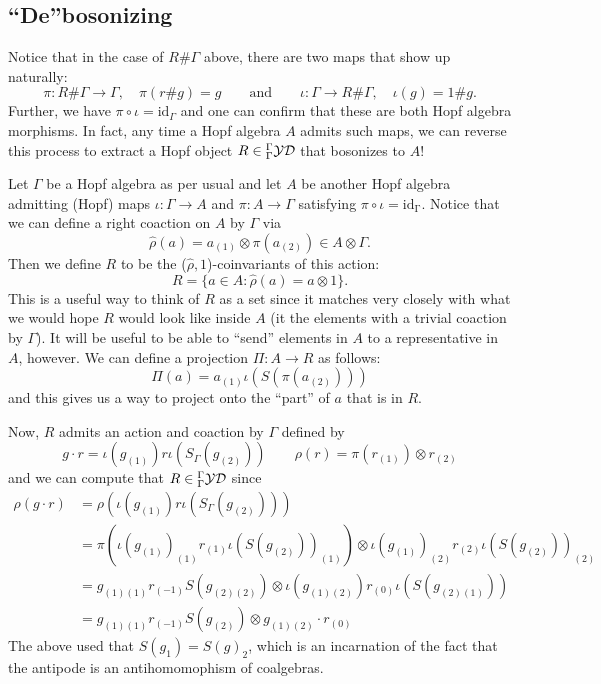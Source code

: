 \documentclass [11pt, proquest] {uwthesis}[2020/02/24]
\begin{document}
\subsection{``De''bosonizing}
    Notice that in the case of $R\#\Gamma$ above, there are two maps that show up naturally:
    \[\pi:R\#\Gamma\to \Gamma,\quad \pi(r\# g)=g\qquad\text{and}\qquad \iota:\Gamma\to R\# \Gamma,\quad \iota(g)=1\# g.\]
    Further, we have $\pi\circ\iota=\mathrm{id}_{\Gamma}$ and one can confirm that these are both Hopf algebra morphisms. In fact, any time a Hopf algebra $A$ admits such maps, we can reverse this process to extract a Hopf object $R\in{^\Gamma_\Gamma\mathcal{YD}}$ that bosonizes to $A$!
    
    Let $\Gamma$ be a Hopf algebra as per usual and let $A$ be another Hopf algebra admitting (Hopf) maps $\iota:\Gamma\to A$ and $\pi:A\to \Gamma$ satisfying $\pi\circ\iota=\mathrm{id_\Gamma}.$ Notice that we can define a right coaction on $A$ by $\Gamma$ via
    \[\hat\rho(a)=a_{(1)}\otimes\pi(a_{(2)})\in A\otimes \Gamma.\]
    Then we define $R$ to be the ($\hat\rho,1$)-coinvariants of this action:
    \[R=\{a\in A:\hat\rho(a)=a\otimes 1\}.\]
    This is a useful way to think of $R$ as a set since it matches very closely with what we would hope $R$ would look like inside $A$ (it the elements with a trivial coaction by $\Gamma$). It will be useful to be able to ``send'' elements in $A$ to a representative in $A$, however. We can define a projection $\Pi:A\to R$ as follows:
    \[\Pi(a)=a_{(1)}\iota(S(\pi(a_{(2)})))\]
    and this gives us a way to project onto the ``part'' of $a$ that is in $R$.
    
    Now, $R$ admits an action and coaction by $\Gamma$ defined by
    \[g\cdot r = \iota(g_{(1)})r\iota(S_\Gamma(g_{(2)}))\qquad \rho(r)=\pi(r_{(1)})\otimes r_{(2)}\]
    and we can compute that $R\in{^\Gamma_\Gamma\mathcal{YD}}$ since
    \begin{align*}
        \rho(g\cdot r)&=\rho(\iota(g_{(1)})r\iota(S_\Gamma(g_{(2)})))\\
        &=\pi(\iota(g_{(1)})_{(1)}r_{(1)}\iota(S(g_{(2)}))_{(1)})\otimes\iota(g_{(1)})_{(2)}r_{(2)}\iota(S(g_{(2)}))_{(2)}\\
        &= g_{(1)(1)}r_{(-1)}S(g_{(2)(2)})\otimes \iota(g_{(1)(2)})r_{(0)}\iota(S(g_{(2)(1)}))\\
        &=g_{(1)(1)}r_{(-1)}S(g_{(2)})\otimes g_{(1)(2)}\cdot r_{(0)}
    \end{align*}
    The above used that $S(g_1)=S(g)_2$, which is an incarnation of the fact that the antipode is an antihomomophism of coalgebras. 
    
\end{document}
